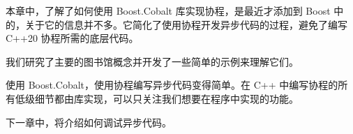本章中，了解了如何使用 Boost.Cobalt 库实现协程，是最近才添加到 Boost 中的，关于它的信息并不多。它简化了使用协程开发异步代码的过程，避免了编写 C++20 协程所需的底层代码。

我们研究了主要的图书馆概念并开发了一些简单的示例来理解它们。

使用 Boost.Cobalt，使用协程编写异步代码变得简单。在 C++ 中编写协程的所有低级细节都由库实现，可以只关注我们想要在程序中实现的功能。

下一章中，将介绍如何调试异步代码。